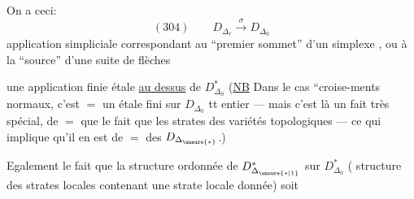 
On a ceci:
\[
(304)\qquad D_{\Delta_r}\xrightarrow{\sigma}D_{\Delta_0}
\]
application simpliciale correspondant au ``premier sommet'' d'un simplexe , ou à la ``source'' d'une suite de flèches
\diagram{\begin{tikzcd}[ampersand replacement=\&,column sep=small]
\bullet \arrow[r,dash] \& \bullet \arrow[r] \& \bullet \arrow[r] \& \cdots \arrow[r] \& \bullet
\end{tikzcd}}


 une application finie étale \uline{au dessus} de $D^*_{\Delta_0}$ (\uline{NB} Dans le cas ``croise-ments normaux, c'est $=$ un  étale fini sur $D_{\Delta_0}$ tt entier --- mais c'est là un fait très spécial, de $=$ que le fait que les  strates  des variétés topologiques --- ce qui implique  qu'il en est  de $=$ des $D_{\Delta_{\unsure{*}}}$.)

Egalement le fait que  la structure ordonnée  de $D^*_{\Delta_{\unsure{*|1}}}$ sur $D^*_{\Delta_0}$ ( structure  des strates locales contenant une strate locale donnée) soit   

